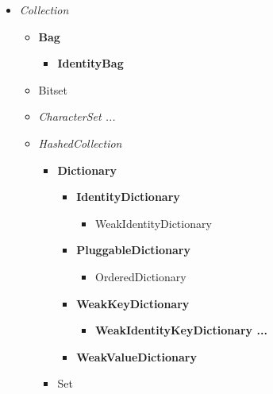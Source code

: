 \documentclass[a4paper,10pt,twoside]{book}
\begin{document}
\begin{figure}
\begin{center}
\small
{}
\begin{itemize}
\item{\emph{Collection}}
    \begin{itemize}
    \item{\textbf{Bag}}
        \begin{itemize}
        \item{\textbf{IdentityBag}}
        \end{itemize}
    \item{Bitset}
    \item{\emph{CharacterSet ...}}
    \item{\emph{HashedCollection}}
        \begin{itemize}
        \item{\textbf{Dictionary}}
            \begin{itemize}
            \item{\textbf{IdentityDictionary}}
                \begin{itemize}
                \item{WeakIdentityDictionary}
                \end{itemize}
            \item{\textbf{PluggableDictionary}}
                \begin{itemize}
                \item{OrderedDictionary}
                \end{itemize}
            \item{\textbf{WeakKeyDictionary}}
                \begin{itemize}
                \item{\textbf{WeakIdentityKeyDictionary ...}}
                \end{itemize}
            \item{\textbf{WeakValueDictionary}}
            \end{itemize}
        \item{Set}
            \begin{itemize}

\end{itemize}
\end{itemize}
\end{itemize}
\end{itemize}
\end{center}
\end{figure}
\end{document}
